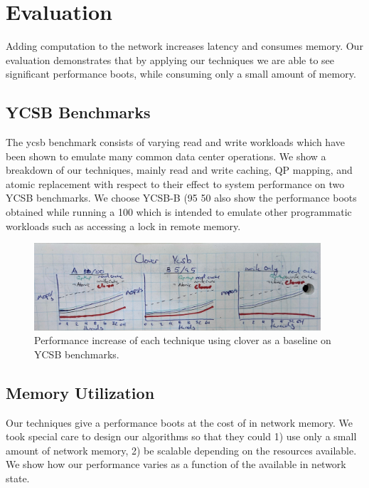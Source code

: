 \section{Evaluation}

Adding computation to the network increases latency and consumes memory. Our
evaluation demonstrates that by applying our techniques we are able to see
significant performance boots, while consuming only a small amount of memory.

\subsection{YCSB Benchmarks}

The ycsb benchmark consists of varying read and write workloads which have been
shown to emulate many common data center operations. We show a breakdown of our
techniques, mainly read and write caching, QP mapping, and atomic replacement
with respect to their effect to system performance on two YCSB benchmarks. We
choose YCSB-B (95%
50%
also show the performance boots obtained while running a 100%
which is intended to emulate other programmatic workloads such as accessing a
lock in remote memory.

\begin{figure}
    \includegraphics[width=0.95\textwidth]{fig/full_system_performance.jpg}
    \caption{{Performance increase of each technique using clover as a baseline on YCSB benchmarks.}}
    \label{fig:full_system_performance}
\end{figure}


\subsection{Memory Utilization}

Our techniques give a performance boots at the cost of in network memory. We
took special care to design our algorithms so that they could 1) use only a
small amount of network memory, 2) be scalable depending on the resources
available. We show how our performance varies as a function of the available in
network state.

